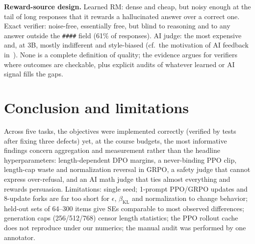 \documentclass{article}
\begin{document}
\textbf{Reward-source design.} Learned RM: dense and cheap, but noisy enough at the tail of long responses that it rewards a hallucinated answer over a correct one. Exact verifier: noise-free, essentially free, but blind to reasoning and to any answer outside the \texttt{\#\#\#\#} field (61\% of responses). AI judge: the most expensive and, at 3B, mostly indifferent and style-biased (cf.\ the motivation of AI feedback in~\cite{bai2022cai,lee2024rlaif}). None is a complete definition of quality; the evidence argues for verifiers where outcomes are checkable, plus explicit audits of whatever learned or AI signal fills the gaps.

\section{Conclusion and limitations}
Across five tasks, the objectives were implemented correctly (verified by tests after fixing three defects) yet, at the course budgets, the most informative findings concern aggregation and measurement rather than the headline hyperparameters: length-dependent DPO margins, a never-binding PPO clip, length-cap waste and normalization reversal in GRPO, a safety judge that cannot express over-refusal, and an AI math judge that ties almost everything and rewards persuasion. Limitations: single seed; 1-prompt PPO/GRPO updates and 8-update forks are far too short for $\epsilon$, $\beta_{\text{KL}}$ and normalization to change behavior; held-out sets of 64--300 items give SEs comparable to most observed differences; generation caps (256/512/768) censor length statistics; the PPO rollout cache does not reproduce under our numerics; the manual audit was performed by one annotator.
\end{document}
